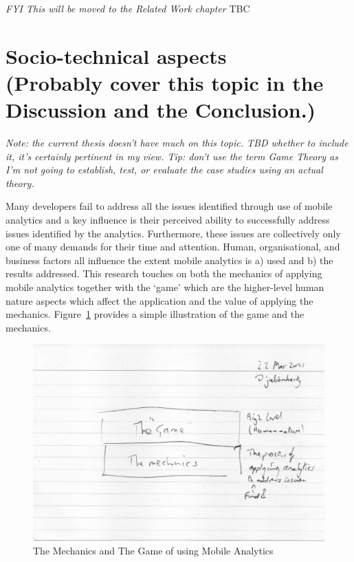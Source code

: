 \textit{FYI This will be moved to the Related Work chapter}
TBC


\clearpage
\section[Socio-technical aspects]{Socio-technical aspects\\ \small{(Probably cover this topic in the Discussion and the Conclusion.)}}

\emph{Note: the current thesis doesn't have much on this topic. TBD whether to include it, it's certainly pertinent in my view. Tip: don't use the term Game Theory as I'm not going to establish, test, or evaluate the case studies using an actual theory.}

Many developers fail to address all the issues identified through use of mobile analytics and a key influence is their perceived ability to successfully address issues identified by the analytics. Furthermore, these issues are collectively only one of many demands for their time and attention. Human, organisational, and business factors all influence the extent mobile analytics is a) used and b) the results addressed. This research touches on both the mechanics of applying mobile analytics together with the `game' which are the higher-level human nature aspects which affect the application and the value of applying the mechanics. Figure~\ref{fig:the-mechanics-the-game} provides a simple illustration of the game and the mechanics.

\begin{figure}
    \centering
    \includegraphics[width=15cm]{images/rough-sketches/The-Mechanics-The-Game.jpeg}
    \caption{The Mechanics and The Game of using Mobile Analytics}
    \label{fig:the-mechanics-the-game}
\end{figure}


